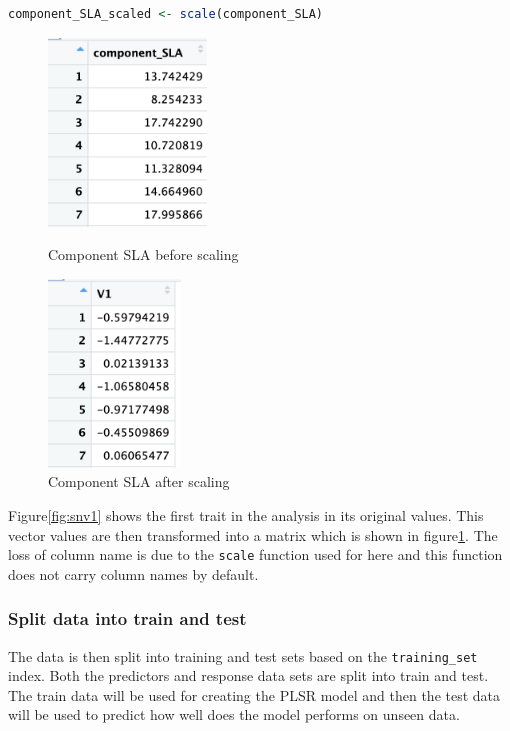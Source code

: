 \documentclass[12pt,a4paper]{report}
\begin{document}
\begin{lstlisting}[language=R, style=mystyle]
component_SLA_scaled <- scale(component_SLA)
\end{lstlisting}

\begin{figure}[h]
    \centering
    \begin{minipage}{0.45\textwidth}
        \centering
        \includegraphics[height=5cm]{Figures/snv1.png} 
        \caption{Component SLA before scaling}
        \label{fig:snv1}
    \end{minipage}
    \hfill
    \begin{minipage}{0.45\textwidth}
        \centering
        \includegraphics[height=5cm]{Figures/snv2.png} 
        \caption{Component SLA after scaling}
        \label{fig:snv2}
    \end{minipage}
\end{figure}

Figure\ref{fig:snv1} shows the first trait in the analysis in its original values. This vector values are then transformed into a matrix which is shown in figure\ref{fig:snv2}. The loss of column name is due to the \texttt{scale} function used for here and this function does not carry column names by default. \\

\subsubsection*{Split data into train and test}
The data is then split into training and test sets based on the \texttt{training\_set} index. Both the predictors and response data sets are split into train and test. The train data will be used for creating the PLSR model and then the test data will be used to predict how well does the model performs on unseen data. \\
\end{document}
